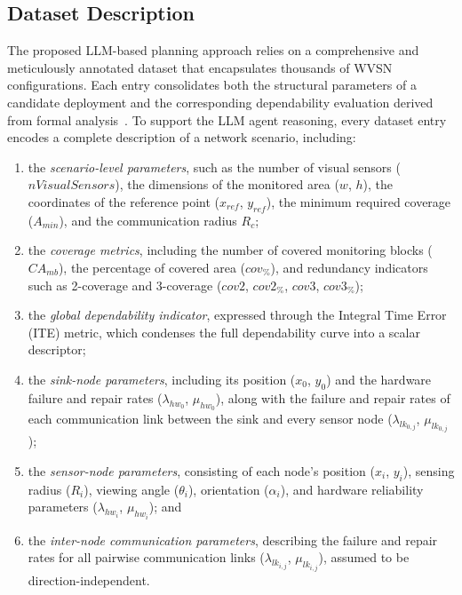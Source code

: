 \subsection{Dataset Description}

The proposed LLM-based planning approach relies on a comprehensive and meticulously annotated dataset that encapsulates thousands of WVSN configurations. Each entry consolidates both the structural parameters of a candidate deployment and the corresponding dependability evaluation derived from formal analysis~\cite{DepML2025}. %
To support the LLM agent reasoning, every dataset entry encodes a complete description of a network scenario, including:

\begin{enumerate}
    \item the \emph{scenario-level parameters}, such as the number of visual sensors ($nVisualSensors$), the dimensions of the monitored area ($w$, $h$), the coordinates of the reference point ($x_{ref}$, $y_{ref}$), the minimum required coverage ($A_{min}$), and the communication radius $R_c$;  
    \item the \emph{coverage metrics}, including the number of covered monitoring blocks ($CA_{mb}$), the percentage of covered area ($cov_{\%}$), and redundancy indicators such as 2-coverage and 3-coverage ($cov2$, $cov2_{\%}$, $cov3$, $cov3_{\%}$);  
    \item the \emph{global dependability indicator}, expressed through the Integral Time Error (ITE) metric, which condenses the full dependability curve into a scalar descriptor;  
    \item the \emph{sink-node parameters}, including its position ($x_0$, $y_0$) and the hardware failure and repair rates ($\lambda_{hw_0}$, $\mu_{hw_0}$), along with the failure and repair rates of each communication link between the sink and every sensor node ($\lambda_{lk_{0,j}}$, $\mu_{lk_{0,j}}$);  
    \item the \emph{sensor-node parameters}, consisting of each node's position ($x_i$, $y_i$), sensing radius ($R_i$), viewing angle ($\theta_i$), orientation ($\alpha_i$), and hardware reliability parameters ($\lambda_{hw_i}$, $\mu_{hw_i}$); and  
    \item the \emph{inter-node communication parameters}, describing the failure and repair rates for all pairwise communication links ($\lambda_{lk_{i,j}}$, $\mu_{lk_{i,j}}$), assumed to be direction-independent.
\end{enumerate}

